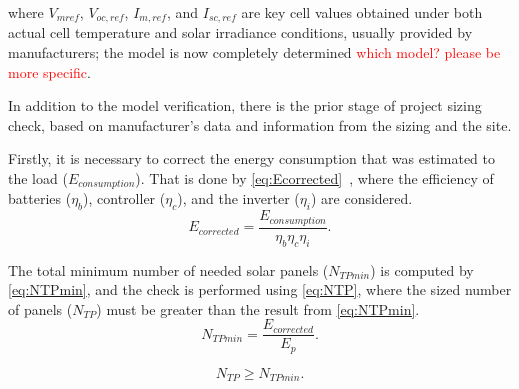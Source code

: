 \documentclass[journal]{IEEEtran}
\begin{document}
\noindent where $V_{mref}$, $V_{oc,ref}$, $I_{m,ref}$, and $I_{sc,ref}$ are key cell values obtained under both actual cell temperature and solar irradiance conditions, usually provided by manufacturers; the model is now completely determined \textcolor{red}{which model? please be more specific}.
%
%
%
%
%
%

In addition to the model verification, there is the prior stage of project sizing check, based on manufacturer's data and information from the sizing and the site. 

Firstly, it is necessary to correct the energy consumption that was estimated to the load ($E_{consumption}$). That is done by \eqref{eq:Ecorrected}~\cite{Pinho}, where the efficiency of batteries ($\eta_{b}$), controller ($\eta_{c}$), and the inverter ($\eta_{i}$) are considered.
\begin{equation}
\label{eq:Ecorrected}
E_{corrected} = \dfrac{E_{consumption}}{ \eta_{b} \eta_{c} \eta_{i} }.
\end{equation}

The total minimum number of needed solar panels ($N_{TPmin}$) is computed by \eqref{eq:NTPmin}, and the check is performed using \eqref{eq:NTP}, where the sized number of panels ($ N_{TP} $) must be greater than the result from \eqref{eq:NTPmin}.
\begin{equation}
\label{eq:NTPmin}
N_{TPmin} = \dfrac{E_{corrected}}{E_{p}}.
\end{equation}

\begin{equation}
\label{eq:NTP}
N_{TP} \geq N_{TPmin}.
\end{equation}
\end{document}
